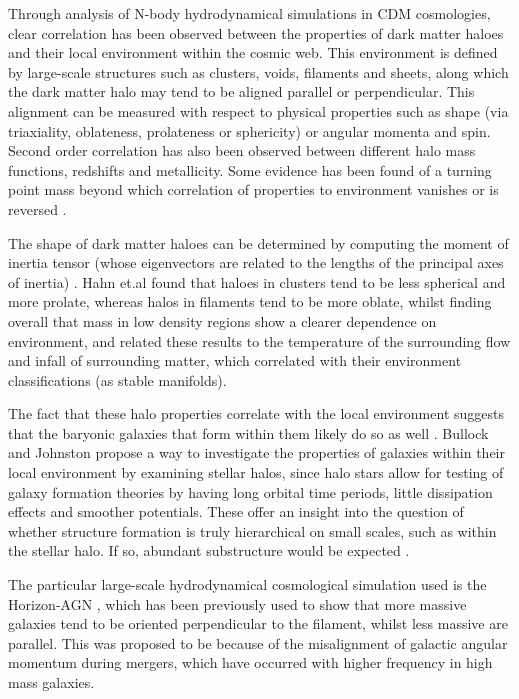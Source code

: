 Through analysis of N-body hydrodynamical simulations in CDM cosmologies, clear correlation has been observed between the properties of dark matter haloes and their local environment within the cosmic web. This environment is defined by large-scale structures such as clusters, voids, filaments and sheets, along which the dark matter halo may tend to be aligned parallel or perpendicular. This alignment can be measured with respect to physical properties such as shape (via triaxiality, oblateness, prolateness or sphericity) or angular momenta and spin. Second order correlation has also been observed between different halo mass functions, redshifts and metallicity. Some evidence has been found of a turning point mass beyond which correlation of properties to environment vanishes or is reversed \cite{hahn07b} \cite{dubois14}. 

The shape of dark matter haloes can be determined by computing the moment of inertia tensor (whose eigenvectors are related to the lengths of the principal axes of inertia) \cite{hahn07a}. Hahn et.al \cite{hahn07a} found that haloes in clusters tend to be less spherical and more prolate, whereas halos in filaments tend to be more oblate, whilst finding overall that mass in low density regions show a clearer dependence on environment, and related these results to the temperature of the surrounding flow and infall of surrounding matter, which correlated with their environment classifications (as stable manifolds). 

The fact that these halo properties correlate with the local environment suggests that the baryonic galaxies that form within them likely do so as well \cite{hahn07b}.  Bullock and Johnston \cite{bullock05} propose a way to investigate the properties of galaxies within their local environment by examining stellar halos, since halo stars allow for testing of galaxy formation theories by having long orbital time periods, little dissipation effects and smoother potentials. These offer an insight into the question of whether structure formation is truly hierarchical on small scales, such as within the stellar halo. If so, abundant substructure would be expected \cite{bullock05}. 

The particular large-scale hydrodynamical cosmological simulation used is the Horizon-AGN \cite{dubois14}, which has been previously used to show that more massive galaxies tend to be oriented perpendicular to the filament, whilst less massive are parallel. This was proposed to be because of the misalignment of galactic angular momentum during mergers, which have occurred with higher frequency in high mass galaxies. 


